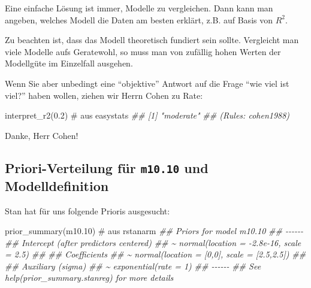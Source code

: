 \documentclass[
  a4paper,
  DIV=11]{scrreprt}
\newenvironment{Shaded}{\begin{snugshade}}{\end{snugshade}}
\newcommand{\CommentTok}[1]{\textcolor[rgb]{0.37,0.37,0.37}{#1}}
\newcommand{\DocumentationTok}[1]{\textcolor[rgb]{0.37,0.37,0.37}{\textit{#1}}}
\newcommand{\FloatTok}[1]{\textcolor[rgb]{0.68,0.00,0.00}{#1}}
\newcommand{\FunctionTok}[1]{\textcolor[rgb]{0.28,0.35,0.67}{#1}}
\newcommand{\NormalTok}[1]{\textcolor[rgb]{0.00,0.23,0.31}{#1}}
\theoremstyle{definition}
\theoremstyle{remark}
\begin{document}
Eine einfache Lösung ist immer, Modelle zu vergleichen. Dann kann man
angeben, welches Modell die Daten am besten erklärt, z.B. auf Basis von
\(R^2\).

Zu beachten ist, dass das Modell theoretisch fundiert sein sollte.
Vergleicht man viele Modelle aufs Geratewohl, so muss man von zufällig
hohen Werten der Modellgüte im Einzelfall ausgehen.

Wenn Sie aber unbedingt eine ``objektive'' Antwort auf die Frage ``wie
viel ist viel?'' haben wollen, ziehen wir Herrn Cohen zu Rate:

\begin{Shaded}
\begin{Highlighting}[]
\FunctionTok{interpret\_r2}\NormalTok{(}\FloatTok{0.2}\NormalTok{)  }\CommentTok{\# aus \textasciigrave{}easystats\textasciigrave{}}
\DocumentationTok{\#\# [1] "moderate"}
\DocumentationTok{\#\# (Rules: cohen1988)}
\end{Highlighting}
\end{Shaded}

Danke, Herr Cohen!

\hypertarget{priori-verteilung-fuxfcr-m10.10-und-modelldefinition}{%
\subsection{\texorpdfstring{Priori-Verteilung für \texttt{m10.10} und
Modelldefinition}{Priori-Verteilung für m10.10 und Modelldefinition}}\label{priori-verteilung-fuxfcr-m10.10-und-modelldefinition}}

Stan hat für uns folgende Prioris ausgesucht:

\begin{Shaded}
\begin{Highlighting}[]
\FunctionTok{prior\_summary}\NormalTok{(m10}\FloatTok{.10}\NormalTok{)  }\CommentTok{\# aus rstanarm}
\DocumentationTok{\#\# Priors for model \textquotesingle{}m10.10\textquotesingle{} }
\DocumentationTok{\#\# {-}{-}{-}{-}{-}{-}}
\DocumentationTok{\#\# Intercept (after predictors centered)}
\DocumentationTok{\#\#  \textasciitilde{} normal(location = {-}2.8e{-}16, scale = 2.5)}
\DocumentationTok{\#\# }
\DocumentationTok{\#\# Coefficients}
\DocumentationTok{\#\#  \textasciitilde{} normal(location = [0,0], scale = [2.5,2.5])}
\DocumentationTok{\#\# }
\DocumentationTok{\#\# Auxiliary (sigma)}
\DocumentationTok{\#\#  \textasciitilde{} exponential(rate = 1)}
\DocumentationTok{\#\# {-}{-}{-}{-}{-}{-}}
\DocumentationTok{\#\# See help(\textquotesingle{}prior\_summary.stanreg\textquotesingle{}) for more details}
\end{Highlighting}
\end{Shaded}
\end{document}
